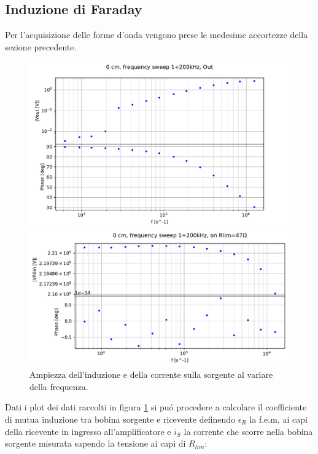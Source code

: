 \subsection{Induzione di Faraday}
Per l'acquisizione delle forme d'onda vengono prese le medesime accortezze della sezione precedente.
\begin{figure}[h]
    \centering
    \begin{minipage}{0.5\textwidth}
        \centering
        \includegraphics[width=\textwidth]{Figure_13.pdf} 
    \end{minipage}\hfill
    \begin{minipage}{0.5\textwidth}
        \centering
        \includegraphics[width=\textwidth]{Figure_14.pdf} 
    \end{minipage}
    \caption{Ampiezza dell'induzione e della corrente sulla sorgente al variare della frequenza.}
    \label{fig:induz}
\end{figure}
Dati i plot dei dati raccolti in figura \ref{fig:induz} si pu\'o procedere a calcolare il coefficiente di mutua induzione tra bobina sorgente e ricevente definendo $\epsilon_R$ la f.e.m. ai capi della ricevente in ingresso all'amplificatore e $i_S$ la corrente che scorre nella bobina sorgente misurata sapendo la tensione ai capi di $R_{lim}$:
